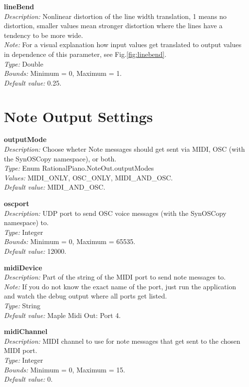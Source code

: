 \documentclass[12pt,a4paper,titlepage,oneside]{report}
\begin{document}
\noindent
\textbf{lineBend} \\
\textit{Description:} Nonlinear distortion of the line width translation, 1 means no distortion, smaller values mean stronger distortion where the lines have a tendency to be more wide. \\
\textit{Note:} For a visual explanation how input values get translated to output values in dependence of this parameter, see Fig.\ref{fig:linebend}. \\
\textit{Type:} Double \\
\textit{Bounds:} Minimum = 0, Maximum = 1. \\
\textit{Default value:} 0.25.


\section{Note Output Settings}

\noindent
\textbf{outputMode} \\
\textit{Description:} Choose wheter Note messages should get sent via MIDI, OSC (with the SynOSCopy namespace), or both. \\
\textit{Type:} Enum RationalPiano.NoteOut.outputModes  \\
\textit{Values:} MIDI\_ONLY, OSC\_ONLY, MIDI\_AND\_OSC. \\
\textit{Default value:} MIDI\_AND\_OSC.

\noindent
\textbf{oscport} \\
\textit{Description:} UDP port to send OSC voice messages (with the SynOSCopy namespace) to. \\
\textit{Type:} Integer \\
\textit{Bounds:} Minimum = 0, Maximum = 65535. \\
\textit{Default value:} 12000.

\noindent
\textbf{midiDevice} \\
\textit{Description:} Part of the string of the MIDI port to send note messages to. \\
\textit{Note:} If you do not know the exact name of the port, just run the application and watch the debug output where all ports get listed. \\
\textit{Type:} String \\
\textit{Default value:} Maple Midi Out: Port 4.

\noindent
\textbf{midiChannel} \\
\textit{Description:} MIDI channel to use for note messages that get sent to the chosen MIDI port. \\
\textit{Type:} Integer \\
\textit{Bounds:} Minimum = 0, Maximum = 15. \\
\textit{Default value:} 0.
\end{document}
